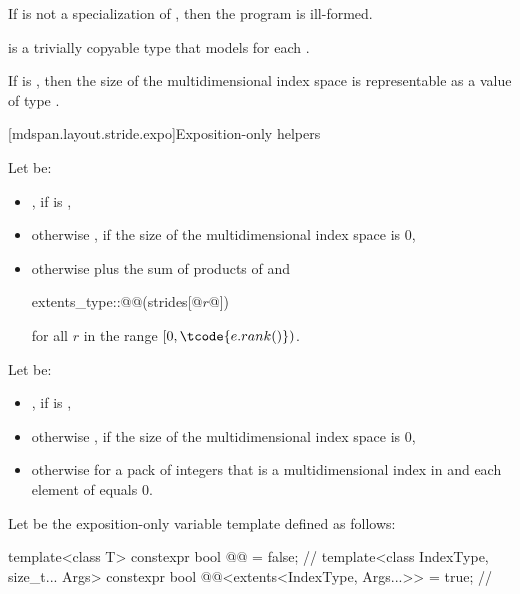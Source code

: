 \pnum
If  is not a specialization of ,
then the program is ill-formed.

\pnum
{} is a trivially copyable type
that models  for each .

\pnum
\mandates
If  is ,
then the size of the multidimensional index space 
is representable as a value of type .

[mdspan.layout.stride.expo]{Exposition-only helpers}

\pnum
Let  be:
\begin{itemize}
\item
{}, if  is ,
\item
otherwise , if the size of the multidimensional index space  is 0,
\item
otherwise  plus the sum of products of
 and
\begin{codeblock}
extents_type::@@(strides[@$r$@])
\end{codeblock}
  for all $r$ in the range $[0, \tcode{e.rank()})$.
\end{itemize}

\pnum
Let  be:
\begin{itemize}
\item
{}, if  is ,
\item
otherwise , if the size of the multidimensional index space  is 0,
\item
otherwise  for a pack of integers 
that is a multidimensional index in  and
each element of  equals 0.
\end{itemize}

\pnum
Let  be the exposition-only variable template
defined as follows:
\begin{codeblock}
template<class T>
  constexpr bool @@ = false;                              // \expos
template<class IndexType, size_t... Args>
  constexpr bool @@<extents<IndexType, Args...>> = true;  // \expos
\end{codeblock}

